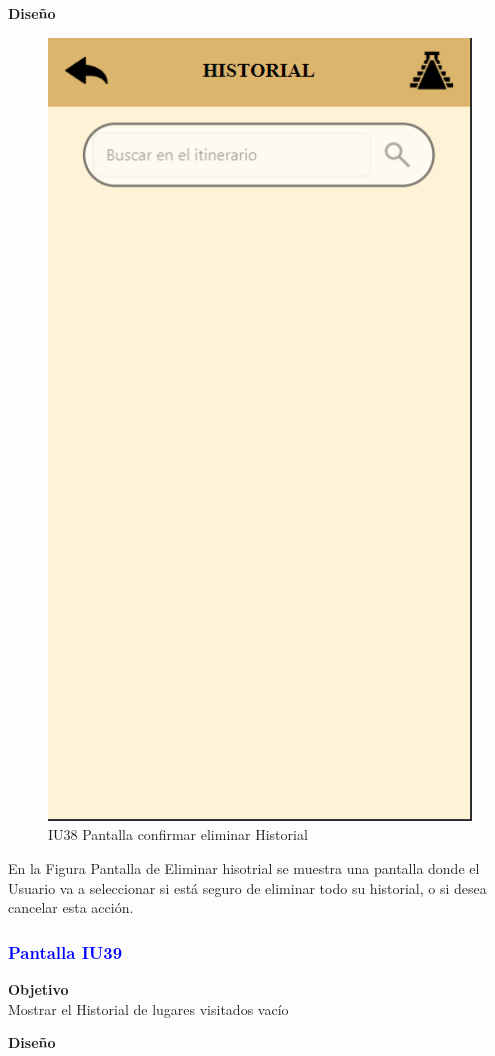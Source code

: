 \textbf{Diseño}

    \begin{figure}[h]
        
            \centering
            \includegraphics[width=.4\linewidth]{entregable final/pantallasSistema/IU16 Pantalla Historial.png}
    \caption{IU38 Pantalla confirmar eliminar Historial}
    
    \end{figure}

En la Figura Pantalla de Eliminar hisotrial se muestra una pantalla donde el Usuario va a seleccionar si está seguro de eliminar todo su historial, o si desea cancelar esta acción. 


\newpage
\subsubsection{\textcolor{blue}{Pantalla IU39 }}

\textbf{Objetivo} \\
Mostrar el Historial de lugares visitados vacío
\vspace{15pt}

\textbf{Diseño}

